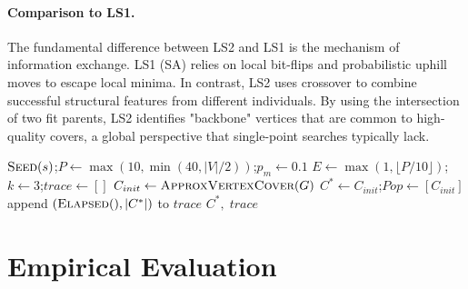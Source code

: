 \documentclass[sigconf]{acmart}
\begin{document}
\paragraph{Comparison to LS1.} The fundamental difference between
LS2 and LS1 is the mechanism of information exchange. LS1 (SA)
relies on local bit-flips and probabilistic uphill moves to escape
local minima. In contrast, LS2 uses crossover to combine successful
structural features from different individuals. By using the
intersection of two fit parents, LS2 identifies "backbone" vertices
that are common to high-quality covers, a global perspective that
single-point searches typically lack.

\begin{algorithm}[t]
  \SetAlgoLined
  \DontPrintSemicolon
  $\textsc{Seed}(s)$;\quad $P \leftarrow \max(10, \min(40, |V|/2))$;\quad $p_m \leftarrow 0.1$\;
  $E \leftarrow \max(1, \lfloor P/10 \rfloor)$;\quad $k \leftarrow 3$;\quad $trace \leftarrow []$\;
  $C_{init} \leftarrow \textsc{ApproxVertexCover}(G)$\;
  $C^* \leftarrow C_{init}$;\quad $Pop \leftarrow [C_{init}]$\;
  append $(\textsc{Elapsed}(), |C^*|)$ to $trace$\;
  \Return $C^*,\; trace$\;
  \caption{Genetic Algorithm for MVC.}
  \label{alg:ls2}
\end{algorithm}
\section{Empirical Evaluation}
\label{sec:eval}
\end{document}
